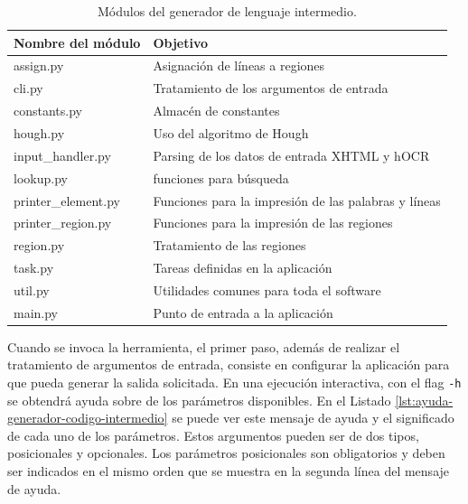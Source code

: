 \begin{table}[ht]
    \centering
    \begin{tabular}{l l}
        Nombre del módulo & Objetivo \\
        \hline
        \hline
        assign.py & Asignación de líneas a regiones \\
        cli.py & Tratamiento de los argumentos de entrada \\
        constants.py & Almacén de constantes \\
        hough.py & Uso del algoritmo de Hough \\
        input\_handler.py & Parsing de los datos de entrada XHTML y hOCR \\
        lookup.py & funciones para búsqueda \\
        printer\_element.py & Funciones para la impresión de las palabras y líneas \\
        printer\_region.py & Funciones para la impresión de las regiones \\
        region.py & Tratamiento de las regiones \\
        task.py & Tareas definidas en la aplicación \\
        util.py & Utilidades comunes para toda el software \\
        main.py & Punto de entrada a la aplicación \\
    \end{tabular}
    \caption{Módulos del generador de lenguaje intermedio.}    
    \label{tab:modulo-generador-codigo-intermedio}
\end{table}

Cuando se invoca la herramienta, el primer paso, además de realizar el tratamiento de argumentos de entrada, consiste en configurar la aplicación para que pueda generar la salida solicitada. En una ejecución interactiva, con el flag \verb|-h| se obtendrá ayuda sobre de los parámetros disponibles. En el Listado \ref{lst:ayuda-generador-codigo-intermedio} se puede ver este mensaje de ayuda y el significado de cada uno de los parámetros. Estos argumentos pueden ser de dos tipos, posicionales y opcionales. Los parámetros posicionales son obligatorios y deben ser indicados en el mismo orden que se muestra en la segunda línea del mensaje de ayuda. 

